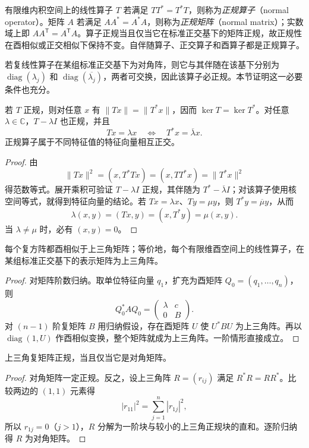 \begin{definition}
有限维内积空间上的线性算子 $T$ 若满足 $TT^*=T^*T$，则称为\emph{正规算子}（normal operator）。矩阵 $A$ 若满足 $AA^*=A^*A$，则称为\emph{正规矩阵}（normal matrix）；实数域上即 $AA^{\mathsf T}=A^{\mathsf T}A$。算子正规当且仅当它在标准正交基下的矩阵正规，故正规性在酉相似或正交相似下保持不变。自伴随算子、正交算子和酉算子都是正规算子。
\end{definition}

若复线性算子在某组标准正交基下为对角阵，则它与其伴随在该基下分别为 $\operatorname{diag}(\lambda_j)$ 和 $\operatorname{diag}(\overline{\lambda_j})$，两者可交换，因此该算子必正规。本节证明这一必要条件也充分。

\begin{lemma}
\label{lem:normal-kernel}
若 $T$ 正规，则对任意 $x$ 有 $\|Tx\|=\|T^*x\|$，因而 $\ker T=\ker T^*$。对任意 $\lambda\in\mathbb C$，$T-\lambda I$ 也正规，并且
\[
    Tx=\lambda x\quad\Longleftrightarrow\quad
    T^*x=\overline\lambda x.
\]
正规算子属于不同特征值的特征向量相互正交。
\end{lemma}
\begin{proof}
由
\[
    \|Tx\|^2=(x,T^*Tx)=(x,TT^*x)=\|T^*x\|^2
\]
得范数等式。展开乘积可验证 $T-\lambda I$ 正规，其伴随为 $T^*-\overline\lambda I$；对该算子使用核空间等式，就得到特征向量的结论。若 $Tx=\lambda x$、$Ty=\mu y$，则 $T^*y=\overline\mu y$，从而
\[
    \lambda(x,y)=(Tx,y)=(x,T^*y)=\mu(x,y).
\]
当 $\lambda\ne\mu$ 时，必有 $(x,y)=0$。
\end{proof}

\begin{theorem}[Schur 定理]
\label{thm:schur-triangularization}
每个复方阵都酉相似于上三角矩阵；等价地，每个有限维酉空间上的线性算子，在某组标准正交基下的表示矩阵为上三角阵。
\end{theorem}
\begin{proof}
对矩阵阶数归纳。取单位特征向量 $q_1$，扩充为酉矩阵 $Q_0=(q_1,\ldots,q_n)$，则
\[
    Q_0^*AQ_0=\begin{pmatrix}\lambda&c\\0&B\end{pmatrix}.
\]
对 $(n-1)$ 阶复矩阵 $B$ 用归纳假设，存在酉矩阵 $U$ 使 $U^*BU$ 为上三角阵。再以 $\operatorname{diag}(1,U)$ 作酉相似变换，整个矩阵就成为上三角阵。一阶情形直接成立。
\end{proof}

\begin{lemma}
\label{lem:triangular-normal-diagonal}
上三角复矩阵正规，当且仅当它是对角矩阵。
\end{lemma}
\begin{proof}
对角矩阵一定正规。反之，设上三角阵 $R=(r_{ij})$ 满足 $R^*R=RR^*$。比较两边的 $(1,1)$ 元素得
\[
    |r_{11}|^2=\sum_{j=1}^n|r_{1j}|^2,
\]
所以 $r_{1j}=0$（$j>1$），$R$ 分解为一阶块与较小的上三角正规块的直和。逐阶归纳得 $R$ 为对角矩阵。
\end{proof}

